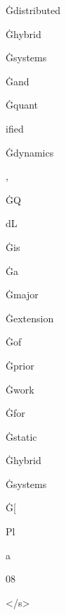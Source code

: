\documentclass[varwidth]{standalone}
\begin{document}
\begin{CJK*}{UTF8}{gbsn}
{{{\colorbox{red!2.490993}{\strut Ġdistributed} \colorbox{red!2.2800086}{\strut Ġhybrid} \colorbox{red!1.6283268}{\strut Ġsystems} \colorbox{red!0.2119316}{\strut Ġand} \colorbox{red!0.106196545}{\strut Ġquant} \colorbox{red!0.040779855}{\strut ified} \colorbox{red!0.16634223}{\strut Ġdynamics} \colorbox{red!0.31195349}{\strut ,} \colorbox{red!0.081785806}{\strut ĠQ} \colorbox{red!0.068794526}{\strut dL} \colorbox{red!0.12786551}{\strut Ġis} \colorbox{red!0.25215605}{\strut Ġa} \colorbox{red!0.3461203}{\strut Ġmajor} \colorbox{red!0.20146549}{\strut Ġextension} \colorbox{red!0.28782833}{\strut Ġof} \colorbox{red!0.30671224}{\strut Ġprior} \colorbox{red!0.4392618}{\strut Ġwork} \colorbox{red!0.7456868}{\strut Ġfor} \colorbox{red!0.7271446}{\strut Ġstatic} \colorbox{red!1.7739624}{\strut Ġhybrid} \colorbox{red!1.6343955}{\strut Ġsystems} \colorbox{red!2.5065303}{\strut Ġ[} \colorbox{red!0.055977173}{\strut Pl} \colorbox{red!0.16462965}{\strut a} \colorbox{red!0.44809043}{\strut 08} \colorbox{red!0.17829242}{\strut </s>} 
}}}
\end{CJK*}
\end{document}
